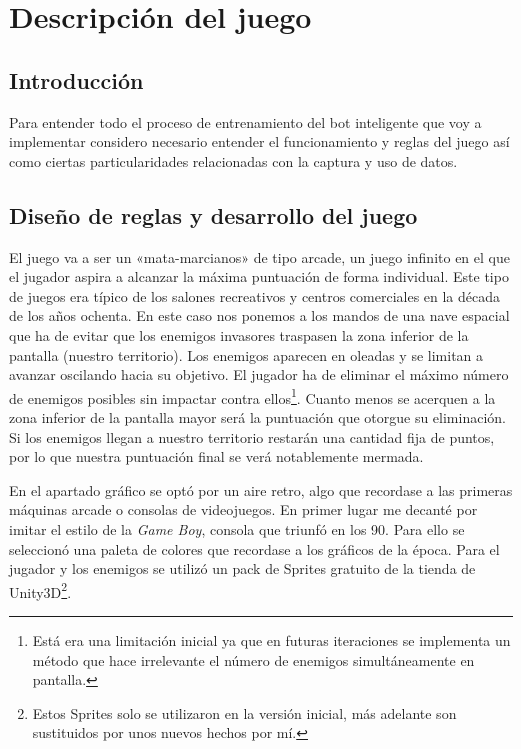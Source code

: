 

\section{Descripción del juego}

\subsection{Introducción}
Para entender todo el proceso de entrenamiento del bot inteligente que voy a implementar considero necesario entender el funcionamiento y reglas del juego así como ciertas particularidades relacionadas con la captura y uso de datos.
\subsection{Diseño de reglas y desarrollo del juego}

El juego va a ser un «mata-marcianos» de tipo arcade, un juego infinito en el que el jugador aspira a alcanzar la máxima puntuación de forma individual. Este tipo de juegos era típico de los salones recreativos y centros comerciales en la década de los años ochenta. En este caso nos ponemos a los mandos de una nave espacial que ha de evitar que los enemigos invasores traspasen la zona inferior de la pantalla (nuestro territorio). Los enemigos aparecen en oleadas y se limitan a avanzar oscilando hacia su objetivo. El jugador ha de eliminar el máximo número de enemigos posibles sin impactar contra ellos\footnote{Está era una limitación inicial ya que en futuras iteraciones se implementa un método que hace irrelevante el número de enemigos simultáneamente en pantalla. }. Cuanto menos se acerquen a la zona inferior de la pantalla mayor será la puntuación que otorgue su eliminación. Si los enemigos llegan a nuestro territorio restarán una cantidad fija de puntos, por lo que nuestra puntuación final se verá notablemente mermada.



En el apartado gráfico se optó por un aire retro, algo que recordase a las primeras máquinas arcade o consolas de videojuegos. En primer lugar me decanté por imitar el estilo de la \emph{Game Boy}, consola que triunfó en los 90. Para ello se seleccionó una paleta de colores que recordase a los gráficos de la época. Para el jugador y los enemigos se utilizó un pack de Sprites gratuito de la tienda de Unity3D\footnote{Estos Sprites solo se utilizaron en la versión inicial, más adelante son sustituidos por unos nuevos hechos por mí.}.


